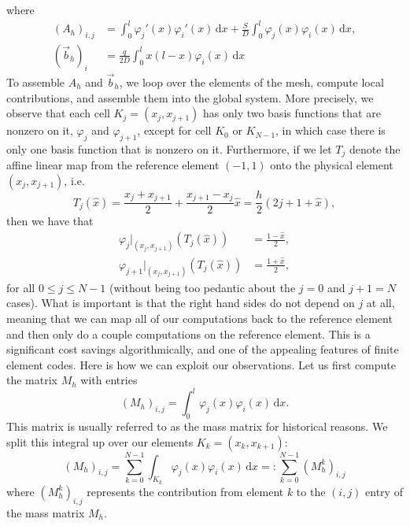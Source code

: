 \documentclass{article}
\theoremstyle{definition}
\theoremstyle{plain}
\begin{document}
where 
\begin{align}
  (A_h)_{i,j} & = \int_0^l\varphi_j'(x)\varphi_i'(x)\,\mathrm dx + \frac{S}{D}\int_0^l\varphi_j(x)\varphi_i(x)\,\mathrm dx, \\
  (\vec b_h)_i & = \frac{q}{2D}\int_0^lx(l-x)\varphi_i(x)\,\mathrm dx
\end{align}
To assemble $A_h$ and $\vec b_h$, we loop over the elements of the mesh, compute local contributions, and assemble them into the global system.
More precisely, we observe that each cell $K_j = (x_j,x_{j+1})$ has only two basis functions that are nonzero on it, $\varphi_j$ and $\varphi_{j+1}$, except for cell $K_0$ or $K_{N-1}$, in which case there is only one basis function that is nonzero on it. 
Furthermore, if we let $T_j$ denote the affine linear map from the reference element $(-1,1)$ onto the physical element $(x_j,x_{j+1})$, i.e.
\begin{equation}
  T_j(\widehat x) = \frac{x_j + x_{j+1}}{2} + \frac{x_{j+1} - x_{j}}{2}\widehat x = \frac{h}{2}(2j+1+\widehat x),
\end{equation}
then we have that 
\begin{align}
  \varphi_j|_{(x_j,x_{j+1})}(T_j(\widehat x)) & = \frac{1-\widehat x}{2}, \\
  \varphi_{j+1}|_{(x_j,x_{j+1})}(T_j(\widehat x)) & = \frac{1+\widehat x}{2},
\end{align}
for all $0 \leq j \leq N-1$ (without being too pedantic about the $j = 0$ and $j+1 = N$ cases).
What is important is that the right hand sides do not depend on $j$ at all, meaning that we can map all of our computations back to the reference element and then only do a couple computations on the reference element.
This is a significant cost savings algorithmically, and one of the appealing features of finite element codes.
Here is how we can exploit our observations.
Let us first compute the matrix $M_h$ with entries
\begin{equation}
  (M_h)_{i,j} = \int_0^l\varphi_j(x)\varphi_i(x)\,\mathrm dx.
\end{equation}
This matrix is usually referred to as the mass matrix for historical reasons.
We split this integral up over our elements $K_k = (x_k,x_{k+1})$:
\begin{equation}
  (M_h)_{i,j} = \sum_{k=0}^{N-1}\int_{K_k}\varphi_j(x)\varphi_i(x)\,\mathrm dx =: \sum_{k=0}^{N-1} (M_h^k)_{i,j}
\end{equation}
where $(M_h^k)_{i,j}$ represents the contribution from element $k$ to the $(i,j)$ entry of the mass matrix $M_h$.
\end{document}
